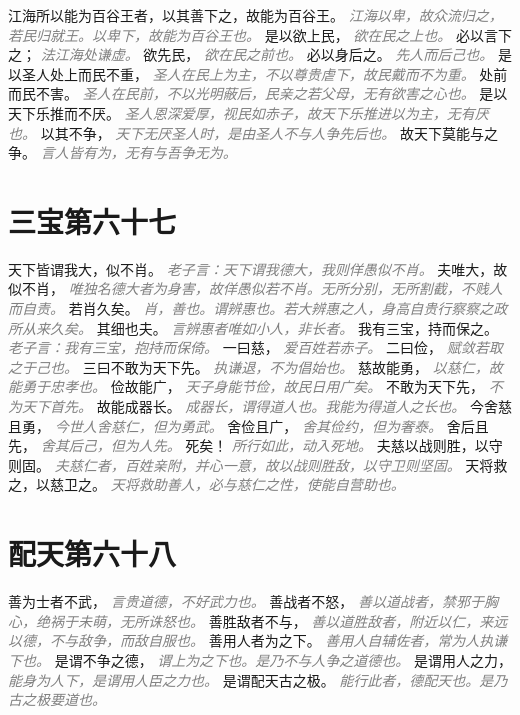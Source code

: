 \documentclass[a4paper,zihao=-4,oneside,landscape,UTF8]{ctexart}
\newcommand{\zhushi}[1]{\scriptsize{\textit{\textcolor{gray}{#1}}}\normalsize}
\begin{document}
江海所以能为百谷王者，以其善下之，故能为百谷王。
\zhushi{江海以卑，故众流归之，若民归就王。以卑下，故能为百谷王也。}
是以欲上民，
\zhushi{欲在民之上也。}
必以言下之；
\zhushi{法江海处谦虚。}
欲先民，
\zhushi{欲在民之前也。}
必以身后之。
\zhushi{先人而后己也。}
是以圣人处上而民不重，
\zhushi{圣人在民上为主，不以尊贵虐下，故民戴而不为重。}
处前而民不害。
\zhushi{圣人在民前，不以光明蔽后，民亲之若父母，无有欲害之心也。}
是以天下乐推而不厌。
\zhushi{圣人恩深爱厚，视民如赤子，故天下乐推进以为主，无有厌也。}
以其不争，
\zhushi{天下无厌圣人时，是由圣人不与人争先后也。}
故天下莫能与之争。
\zhushi{言人皆有为，无有与吾争无为。}


\section{三宝第六十七}

天下皆谓我大，似不肖。
\zhushi{老子言：天下谓我德大，我则佯愚似不肖。}
夫唯大，故似不肖，
\zhushi{唯独名德大者为身害，故佯愚似若不肖。无所分别，无所割截，不贱人而自责。}
若肖久矣。
\zhushi{肖，善也。谓辨惠也。若大辨惠之人，身高自贵行察察之政所从来久矣。}
其细也夫。
\zhushi{言辨惠者唯如小人，非长者。}
我有三宝，持而保之。
\zhushi{老子言：我有三宝，抱持而保倚。}
一曰慈，
\zhushi{爱百姓若赤子。}
二曰俭，
\zhushi{赋敛若取之于己也。}
三曰不敢为天下先。
\zhushi{执谦退，不为倡始也。}
慈故能勇，
\zhushi{以慈仁，故能勇于忠孝也。}
俭故能广，
\zhushi{天子身能节俭，故民日用广矣。}
不敢为天下先，
\zhushi{不为天下首先。}
故能成器长。
\zhushi{成器长，谓得道人也。我能为得道人之长也。}
今舍慈且勇，
\zhushi{今世人舍慈仁，但为勇武。}
舍俭且广，
\zhushi{舍其俭约，但为奢泰。}
舍后且先，
\zhushi{舍其后己，但为人先。}
死矣！
\zhushi{所行如此，动入死地。}
夫慈以战则胜，以守则固。
\zhushi{夫慈仁者，百姓亲附，并心一意，故以战则胜敌，以守卫则坚固。}
天将救之，以慈卫之。
\zhushi{天将救助善人，必与慈仁之性，使能自营助也。}


\section{配天第六十八}

善为士者不武，
\zhushi{言贵道德，不好武力也。}
善战者不怒，
\zhushi{善以道战者，禁邪于胸心，绝祸于未萌，无所诛怒也。}
善胜敌者不与，
\zhushi{善以道胜敌者，附近以仁，来远以德，不与敌争，而敌自服也。}
善用人者为之下。
\zhushi{善用人自辅佐者，常为人执谦下也。}
是谓不争之德，
\zhushi{谓上为之下也。是乃不与人争之道德也。}
是谓用人之力，
\zhushi{能身为人下，是谓用人臣之力也。}
是谓配天古之极。
\zhushi{能行此者，德配天也。是乃古之极要道也。}
\end{document}
